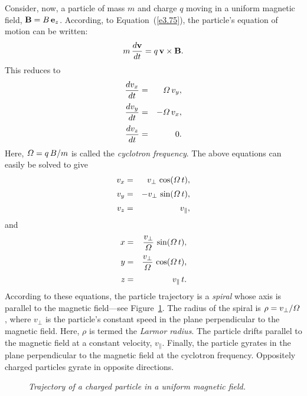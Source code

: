 Consider, now, a particle of mass $m$ and charge $q$ moving in a uniform
magnetic field, ${\bf B} = B\,{\bf e}_z$. According, to
Equation~(\ref{e3.75}), the particle's equation of motion can be written:
\begin{equation}
m\,\frac{d{\bf v}}{dt} = q\,{\bf v}\times{\bf B}.
\end{equation}
This reduces to
\begin{eqnarray}
\frac{dv_x}{dt} &=& {\mit\Omega}\,v_y,\\[0.5ex]
\frac{dv_y}{dt} &=&-{\mit\Omega}\,v_x,\\[0.5ex]
\frac{d v_z}{dt} &=& 0.
\end{eqnarray}
Here, ${\mit\Omega} = q\,B/m$ is called the {\em cyclotron frequency}.
The above equations can easily be solved to give
\begin{eqnarray}
v_x&=& v_\perp\,\cos({\mit\Omega}\,t),\\[0.5ex]
v_y&=& - v_\perp\,\sin({\mit\Omega}\,t),\\[0.5ex]
v_z &=& v_\parallel,
\end{eqnarray}
and
\begin{eqnarray}
x&=& \frac{v_\perp}{\mit\Omega}\,\sin({\mit\Omega}\,t),\\[0.5ex]
y&=& \frac{v_\perp}{\mit\Omega}\,\cos({\mit\Omega}\,t),\\[0.5ex]
z &=& v_\parallel\,t.
\end{eqnarray}
According to these equations, the particle trajectory is a {\em spiral}\/
whose axis is parallel to the magnetic field---see Figure~\ref{flamor}. The radius of the
spiral is $\rho=v_\perp/{\mit\Omega}$, where $v_\perp$ is the particle's
constant speed in the plane perpendicular to the magnetic field. Here, $\rho$
is termed the {\em Larmor radius}.
The particle
drifts parallel to the magnetic field at a constant velocity, $v_\parallel$. Finally,
the particle gyrates in the plane perpendicular to the magnetic field at the cyclotron
frequency. Oppositely charged particles gyrate in opposite directions.
\begin{figure}
\epsfysize=0.75in
\centerline{}
\caption{\em Trajectory of a charged particle in a uniform magnetic field.}\label{flamor}
\end{figure}

